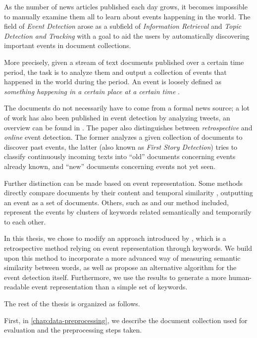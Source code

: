 As the number of news articles published each day grows, it becomes impossible to manually examine them all to learn about events happening in the world. The field of \textit{Event Detection} arose as a subfield of \textit{Information Retrieval} and \textit{Topic Detection and Tracking} with a goal to aid the users by automatically discovering important events in document collections.

More precisely, given a stream of text documents published over a certain time period, the task is to analyze them and output a collection of events that happened in the world during the period. An event is loosely defined as \textit{something happening in a certain place at a certain time} \cite{retrospective-online-study}.

The documents do not necessarily have to come from a formal news source; a lot of work has also been published in event detection by analyzing tweets, an overview can be found in \cite{twitter-survey}. The paper also distinguishes between \textit{retrospective} and \textit{online} event detection. The former analyzes a given collection of documents to discover past events, the latter (also known as \textit{First Story Detection}) tries to classify continuously incoming texts into ``old'' documents concerning events already known, and ``new'' documents concerning events not yet seen.

Further distinction can be made based on event representation. Some methods directly compare documents by their content and temporal similarity \citep{document-bursty-representation}, outputting an event as a set of documents. Others, such as \cite{parameter-free, event-detection} and our method included, represent the events by clusters of keywords related semantically and temporarily to each other.

In this thesis, we chose to modify an approach introduced by \cite{event-detection}, which is a retrospective method relying on event representation through keywords. We build upon this method to incorporate a more advanced way of measuring semantic similarity between words, as well as propose an alternative algorithm for the event detection itself. Furthermore, we use the results to generate a more human-readable event representation than a simple set of keywords.

The rest of the thesis is organized as follows.

First, in \autoref{chap:data-preprocessing}, we describe the document collection used for evaluation and the preprocessing steps taken.

